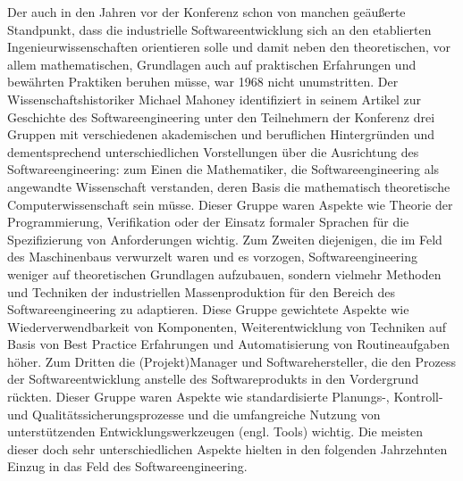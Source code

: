 
\label{text:Mahoney}
Der auch in den Jahren vor der Konferenz schon von manchen geäußerte Standpunkt, dass die industrielle Softwareentwicklung sich an den etablierten Ingenieurwissenschaften orientieren solle und damit neben den theoretischen, vor allem mathematischen, Grundlagen auch auf praktischen Erfahrungen und bewährten Praktiken beruhen müsse, war 1968 nicht unumstritten.
Der Wissenschaftshistoriker Michael Mahoney identifiziert in seinem Artikel zur Geschichte des Softwareengineering \cite{mah04} unter den Teilnehmern der Konferenz drei Gruppen mit verschiedenen akademischen und beruflichen Hintergründen und dementsprechend unterschiedlichen Vorstellungen über die Ausrichtung des Softwareengineering: 
zum Einen die Mathematiker, die Softwareengineering als angewandte Wissenschaft verstanden, deren Basis die mathematisch theoretische Computerwissenschaft sein müsse. Dieser Gruppe waren Aspekte wie Theorie der Programmierung, Verifikation oder der Einsatz formaler Sprachen für die Spezifizierung von Anforderungen wichtig. Zum Zweiten diejenigen, die im Feld des Maschinenbaus verwurzelt waren und es vorzogen, Softwareengineering weniger auf theoretischen Grundlagen aufzubauen, sondern vielmehr Methoden und Techniken der industriellen Massenproduktion für den Bereich des Softwareengineering zu adaptieren. Diese Gruppe gewichtete Aspekte wie Wiederverwendbarkeit von Komponenten, Weiterentwicklung von Techniken auf Basis von Best Practice Erfahrungen und Automatisierung von Routineaufgaben höher. Zum Dritten die (Projekt)Manager und Softwarehersteller, die den Prozess der Softwareentwicklung anstelle des Softwareprodukts in den Vordergrund rückten. Dieser Gruppe waren Aspekte wie standardisierte Planungs-, Kontroll- und Qualitätssicherungsprozesse und die umfangreiche Nutzung von unterstützenden Entwicklungswerkzeugen (engl. Tools) wichtig. Die meisten dieser doch sehr unterschiedlichen Aspekte hielten in den folgenden Jahrzehnten Einzug in das Feld des Softwareengineering.

